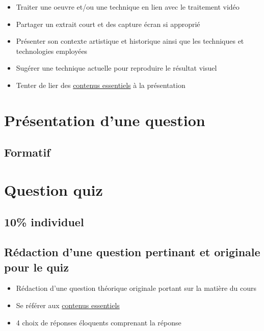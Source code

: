 \documentclass[
]{book}
\providecommand{\tightlist}{%
  \setlength{\itemsep}{0pt}\setlength{\parskip}{0pt}}
\begin{document}
\begin{itemize}
\tightlist
\item
  Traiter une oeuvre et/ou une technique en lien avec le traitement vidéo\\
\item
  Partager un extrait court et des capture écran si approprié
\item
  Présenter son contexte artistique et historique ainsi que les techniques et technologies employées
\item
  Sugérer une technique actuelle pour reproduire le résultat visuel
\item
  Tenter de lier des \protect\hyperlink{contenus_essentiels}{contenus essentiels} à la présentation
\end{itemize}

\hypertarget{formatif_2}{%
\section{Présentation d'une question}\label{formatif_2}}

\hypertarget{formatif-1}{%
\subsection{Formatif}\label{formatif-1}}

\hypertarget{sommatif_2}{%
\section{Question quiz}\label{sommatif_2}}

\hypertarget{individuel}{%
\subsection{10\% individuel}\label{individuel}}

\hypertarget{ruxe9daction-dune-question-pertinant-et-originale-pour-le-quiz}{%
\subsection{Rédaction d'une question pertinant et originale pour le quiz}\label{ruxe9daction-dune-question-pertinant-et-originale-pour-le-quiz}}

\begin{itemize}
\tightlist
\item
  Rédaction d'une question théorique originale portant sur la matière du cours
\item
  Se référer aux \protect\hyperlink{contenus_essentiels}{contenus essentiels}
\item
  4 choix de réponses éloquents comprenant la réponse
\end{itemize}
\end{document}
